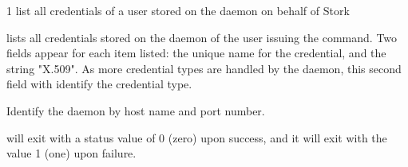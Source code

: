 \begin{ManPage}{\label{man-stork-list-cred}}{1}
{list all credentials of a user stored on the  daemon on behalf of Stork}

\Synopsis {}
\ToolArgsBase



\Description 

 lists all credentials stored on the  daemon
of the user issuing the  command.
Two fields appear for each item listed:
the unique name for the credential,
and the string "X.509".
As more credential types are handled by the  daemon,
this second field with identify the credential type.


\begin{Options}
  \ToolArgsBaseDesc
    {Identify the  daemon by host name and port number.}
\end{Options}

\ExitStatus

 will exit with a status value of 0 (zero) upon success,
and it will exit with the value 1 (one) upon failure.

\end{ManPage}
